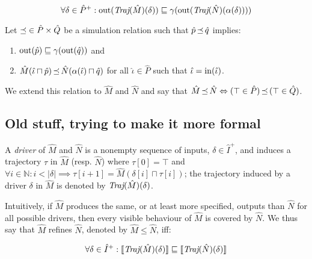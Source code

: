 \begin{equation*}
\forall \delta \in \hat P^{+} : \operatorname{out}(\textit{Traj}(\hat M)(\delta)) \sqsubseteq \operatorname{\gamma}(\operatorname{out}(\textit{Traj}(\hat N)(\operatorname{\alpha}(\delta))))
\end{equation*}

Let $\operatorname{\mathrel{\preceq}} \in \hat P \times \hat Q$ be a simulation relation such that $\hat p \operatorname{\mathrel{\preceq}} \hat q$ implies:

\begin{enumerate}
\item $\operatorname{out}(\hat p) \sqsubseteq \gamma(\operatorname{out}(\hat q))$ and
\item $\hat M(\hat \iota \sqcap \hat p) \operatorname{\mathrel{\preceq}} \hat N(\operatorname{\alpha}(\hat \iota) \sqcap \hat q)$ for all $\hat \iota \in \hat P$ such that $\hat \iota = \operatorname{in}(\hat \iota)$.
\end{enumerate}

\noindent We extend this relation to $\hat M$ and $\hat N$ and say that $\hat M \operatorname{\mathrel{\preceq}} \hat N \Leftrightarrow (\top \in \hat P) \operatorname{\mathrel{\preceq}} \, (\top \in \hat Q)$.

\subsection{Old stuff, trying to make it more formal}

A \textit{driver} of $\hat M$ and $\hat N$ is a nonempty sequence of inputs, $\delta \in \hat I^{+}$, and induces a trajectory $\tau$ in $\hat M$ (resp. $\hat N$) where $\tau[0] = \top$ and $\forall i \in \mathbb{N} : i < | \delta | \implies \tau[i+1] = \hat M(\delta[i] \sqcap \tau[i])$; the trajectory induced by a driver $\delta$ in $\hat M$ is denoted by $\textit{Traj}(\hat M)(\delta)$.

Intuitively, if $\hat M$ produces the same, or at least more specified, outputs than $\hat N$ for all possible drivers, then every visible behaviour of $\hat M$ is covered by $\hat N$. We thus say that $\hat M$ refines $\hat N$, denoted by $\hat M \leq \hat N$, iff:



\begin{equation*}
\forall \delta \in \hat I^{+} : \llbracket\textit{Traj}(\hat M)(\delta)\rrbracket \sqsubseteq \llbracket\textit{Traj}(\hat N)(\delta)\rrbracket
\end{equation*}


